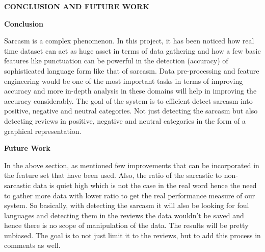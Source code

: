 \documentclass[oneside,a4paper,12pt]{book}
\begin{document}
\textbf{CONCLUSION AND FUTURE WORK}
\par
\textbf{Conclusion}
\par Sarcasm is a complex phenomenon. In this project, it has been noticed how real time dataset can act as huge asset in terms of data gathering and how a few basic features like punctuation can be powerful in the detection (accuracy) of sophisticated language form like that of sarcasm. Data pre-processing and feature engineering would be one of the most important tasks in terms of improving accuracy and more in-depth analysis in these domains will help in improving the accuracy considerably. The goal of the system is to efficient detect sarcasm into positive, negative and neutral categories. Not just detecting the sarcasm but also detecting reviews in positive, negative and neutral categories in the form of a graphical representation.

\textbf{Future Work}
\par
	In the above section, as mentioned few improvements that can be incorporated in the feature set that have been used. Also, the ratio of the sarcastic to non-sarcastic data is quiet high which is not the case in the real word hence the need to gather more data with lower ratio to get the real performance measure of our system. So basically, with detecting the sarcasm it will also be looking for foul languages and detecting them in the reviews the data wouldn’t be saved and hence there is no scope of manipulation of the data. The results will be pretty unbiased. The goal is to not just limit it to the reviews, but to add  this process in comments as well.
\newpage
\end{document}
